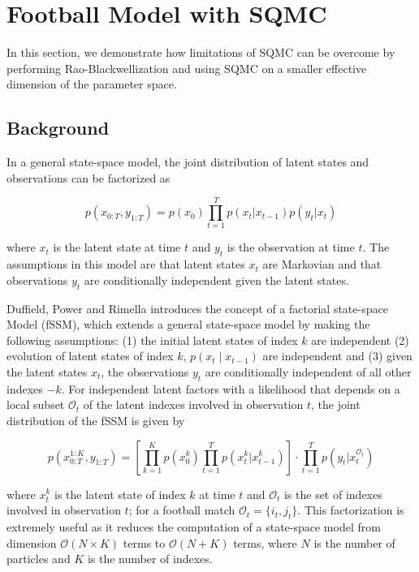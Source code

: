 \chapter{Football Model with SQMC}
\label{ch:model}
In this section, we demonstrate how limitations of SQMC can be overcome by performing Rao-Blackwellization and using SQMC on a smaller effective dimension of the parameter space.


\section{Background}
In a general state-space model, the joint distribution of latent states and observations can be factorized as 

\begin{equation}
p(x_{0:T}, y_{1:T}) = p(x_0) \prod_{t=1}^T p(x_t|x_{t-1})p(y_t|x_t) \tag{2.1}
\end{equation}

where $x_t$ is the latent state at time $t$ and $y_t$ is the observation at time $t$. The assumptions in this model are that latent states $x_t$ are Markovian and that observations $y_t$ are conditionally independent given the latent states. 

Duffield, Power and Rimella \citep{duffieldpowerrimella2024factorialssm} introduces the concept of a factorial state-space Model (fSSM), which extends a general state-space model by making the following assumptions: (1) the initial latent states of index $k$ are independent (2) evolution of latent states of index $k$, $p(x_t \mid x_{t-1})$ are independent and (3) given the latent states $x_t$, the observations $y_t$ are conditionally independent of all other indexes $-k$. For independent latent factors with a likelihood that depends on a local subset $\mathcal{O}_t$ of the latent indexes involved in observation $t$, the joint distribution of the fSSM is given by

\begin{equation}
p(x_{0:T}^{1:K}, y_{1:T}) = \left[ \prod_{k=1}^K p(x_0^k) \prod_{t=1}^T p(x_t^k|x_{t-1}^k) \right] \cdot \prod_{t=1}^T p(y_t|x_t^{\mathcal{O}_t}) \tag{2.2}
\end{equation}

where $x_t^k$ is the latent state of index $k$ at time $t$ and $\mathcal{O}_t$ is the set of indexes involved in observation $t$; for a football match $\mathcal{O}_t = \{i_t, j_t\}$. This factorization is extremely useful as it reduces the computation of a state-space model from dimension $\mathcal{O}(N \times K)$ terms to $\mathcal{O}(N + K)$ terms, where $N$ is the number of particles and $K$ is the number of indexes.

